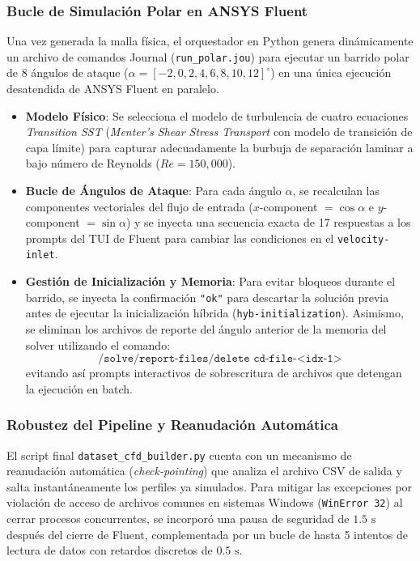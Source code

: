\begin{enumerate}
\subsubsection{Bucle de Simulación Polar en ANSYS Fluent}
Una vez generada la malla física, el orquestador en Python genera dinámicamente un archivo de comandos Journal (\texttt{run\_polar.jou}) para ejecutar un barrido polar de 8 ángulos de ataque ($\alpha = [-2, 0, 2, 4, 6, 8, 10, 12]^\circ$) en una única ejecución desatendida de ANSYS Fluent en paralelo.
\begin{itemize}
    \item \textbf{Modelo Físico}: Se selecciona el modelo de turbulencia de cuatro ecuaciones \textit{Transition SST} (\textit{Menter's Shear Stress Transport} con modelo de transición de capa límite) para capturar adecuadamente la burbuja de separación laminar a bajo número de Reynolds ($Re = 150{,}000$).
    \item \textbf{Bucle de Ángulos de Ataque}: Para cada ángulo $\alpha$, se recalculan las componentes vectoriales del flujo de entrada ($x$-component $= \cos\alpha$ e $y$-component $= \sin\alpha$) y se inyecta una secuencia exacta de 17 respuestas a los prompts del TUI de Fluent para cambiar las condiciones en el \texttt{velocity-inlet}.
    \item \textbf{Gestión de Inicialización y Memoria}: Para evitar bloqueos durante el barrido, se inyecta la confirmación \texttt{"ok"} para descartar la solución previa antes de ejecutar la inicialización híbrida (\texttt{hyb-initialization}). Asimismo, se eliminan los archivos de reporte del ángulo anterior de la memoria del solver utilizando el comando:
        \begin{equation}
            \texttt{/solve/report-files/delete cd-file-<idx-1>}
        \end{equation}
        evitando así prompts interactivos de sobrescritura de archivos que detengan la ejecución en batch.
\end{itemize}

\subsubsection{Robustez del Pipeline y Reanudación Automática}
El script final \texttt{dataset\_cfd\_builder.py} cuenta con un mecanismo de reanudación automática (\textit{check-pointing}) que analiza el archivo CSV de salida y salta instantáneamente los perfiles ya simulados. Para mitigar las excepciones por violación de acceso de archivos comunes en sistemas Windows (\texttt{WinError 32}) al cerrar procesos concurrentes, se incorporó una pausa de seguridad de $1.5\text{ s}$ después del cierre de Fluent, complementada por un bucle de hasta 5 intentos de lectura de datos con retardos discretos de $0.5\text{ s}$.


\end{enumerate}
